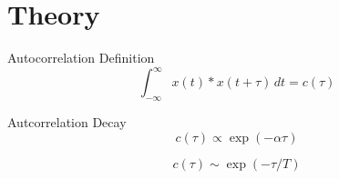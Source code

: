 \section[Theory]{Theory}
\label{sec:theory}


\begin{frame}{Autocorrelation Definition}
	\begin{equation}
		\label{eq:autocorrDef}
		\int_{-\infty}^{\infty} x(t)*x(t+\tau) \,dt = c(\tau)
	\end{equation} 
\end{frame}


\begin{frame}{Autcorrelation Decay}
	\begin{equation}
		\label{eq:autocorrDecay1}
		c(\tau) \propto \exp(-\alpha\tau)
	\end{equation}
	
	\begin{equation}
		\label{eq:autocorrDecay2}
		c(\tau) \sim \exp(-\tau/T)
	\end{equation}
\end{frame}